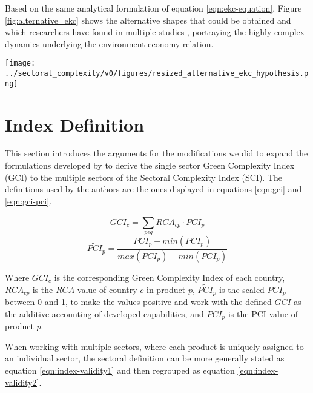 \begin{appendices}
Based on the same analytical formulation of equation \eqref{eqn:ekc-equation}, Figure \ref{fig:alternative_ekc} shows the alternative shapes that could be obtained and which researchers have found in multiple studies \citep{ozokcuEconomicGrowthEnergy2017, lazarPollutionEconomicGrowth2019, frodymaRevisitingEnvironmentalKuznets2022}, portraying the highly complex dynamics underlying the environment-economy relation.

\begin{figure*}[hbt]
	\centering
	\texttt{[image: ../sectoral\_complexity/v0/figures/resized\_alternative\_ekc\_hypothesis.png]}
	\caption{\textbf{Alternative EKC hypothesis relations.} Environment-economy relations derived from varying $\beta_{1}$ and $\beta_{2}$ coefficients.}
	\label{fig:alternative_ekc}
\end{figure*}


\section{Index Definition}
\label{annex:index-validity}
This section introduces the arguments for the modifications we did to expand the formulations developed by \cite{mealyEconomicComplexityGreen2022} to derive the single sector Green Complexity Index (GCI) to the multiple sectors of the Sectoral Complexity Index (SCI). The definitions used by the authors are the ones displayed in equations \eqref{eqn:gci} and \eqref{eqn:gci-pci}.

\begin{equation}\label{eqn:gci}
    GCI_{c} = \sum_{p\epsilon g}RCA_{cp} \cdot \widetilde{PCI}_{p}
\end{equation}
\begin{equation}\label{eqn:gci-pci}
    \widetilde{PCI}_{p} = \frac{PCI_{p} - min(PCI_{p})}{max(PCI_{p}) - min(PCI_{p})}
\end{equation}

Where $GCI_{c}$ is the corresponding Green Complexity Index of each country, $RCA_{cp}$ is the $RCA$ value of country $c$ in product $p$, $\widetilde{PCI}_{p}$ is the scaled $PCI_{p}$ between 0 and 1, to make the values positive and work with the defined $GCI$ as the additive accounting of developed capabilities, and $PCI_{p}$ is the PCI value of product $p$.

When working with multiple sectors, where each product is uniquely assigned to an individual sector, the sectoral definition can be more generally stated as equation \eqref{eqn:index-validity1} and then regrouped as equation \eqref{eqn:index-validity2}.


\end{appendices}

